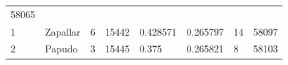 \documentclass[]{article}
\begin{document}
\begin{longtable}[]{@{}llllllll@{}}
\begin{minipage}[t]{0.10\columnwidth}
58065\strut
\end{minipage}\tabularnewline
\begin{minipage}[t]{0.03\columnwidth}\raggedright
1\strut
\end{minipage} & \begin{minipage}[t]{0.09\columnwidth}\raggedright
Zapallar\strut
\end{minipage} & \begin{minipage}[t]{0.14\columnwidth}\raggedright
6\strut
\end{minipage} & \begin{minipage}[t]{0.13\columnwidth}\raggedright
15442\strut
\end{minipage} & \begin{minipage}[t]{0.10\columnwidth}\raggedright
0.428571\strut
\end{minipage} & \begin{minipage}[t]{0.09\columnwidth}\raggedright
0.265797\strut
\end{minipage} & \begin{minipage}[t]{0.10\columnwidth}\raggedright
14\strut
\end{minipage} & \begin{minipage}[t]{0.10\columnwidth}\raggedright
58097\strut
\end{minipage}\tabularnewline
\begin{minipage}[t]{0.03\columnwidth}\raggedright
2\strut
\end{minipage} & \begin{minipage}[t]{0.09\columnwidth}\raggedright
Papudo\strut
\end{minipage} & \begin{minipage}[t]{0.14\columnwidth}\raggedright
3\strut
\end{minipage} & \begin{minipage}[t]{0.13\columnwidth}\raggedright
15445\strut
\end{minipage} & \begin{minipage}[t]{0.10\columnwidth}\raggedright
0.375\strut
\end{minipage} & \begin{minipage}[t]{0.09\columnwidth}\raggedright
0.265821\strut
\end{minipage} & \begin{minipage}[t]{0.10\columnwidth}\raggedright
8\strut
\end{minipage} & \begin{minipage}[t]{0.10\columnwidth}\raggedright
58103\strut
\end{minipage}\tabularnewline

\end{longtable}
\end{document}
